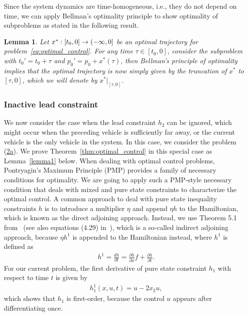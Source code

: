 \documentclass[a4paper]{article}
\theoremstyle{definition}
\theoremstyle{plain}
\newtheorem{lemma}{Lemma}
\begin{document}
Since the system dynamics are time-homogeneous, i.e., they do not depend on
time, we can apply Bellman's optimality principle to show optimality of
subproblems as stated in the following result.

\begin{lemma}
  \label{bellman}
  Let $x^{*}: [t_{0}, 0] \rightarrow (-\infty,0]$ be an optimal
  trajectory for problem~\eqref{eq:optimal_control}. For any time $\tau \in [t_{0}, 0]$, consider the subproblem with
  $t_{0}' = t_{0} + \tau$ and $p_{0}' = p_{0} + x^{*}(\tau)$, then Bellman's
  principle of optimality implies that the optimal trajectory is now simply
  given by the truncation of $x^{*}$ to $[\tau, 0]$, which we will denote by
  $x^{*}|_{[\tau, 0]}$.
\end{lemma}


\subsubsection{Inactive lead constraint}
\label{sec:single_vehicle}

We now consider the case when the lead constraint $h_{2}$ can be ignored,
which might occur when the preceding vehicle is sufficiently far away, or the
current vehicle is the only vehicle in the system. In this case, we consider the
problem (\hyperref[eq:setting]{2a}). We prove Theorem~\ref{thm:optimal_control} in this special case
as Lemma~\ref{lemma1} below.
%
%
When dealing with optimal control problems, Pontryagin's Maximum Principle (PMP)
provides a family of necessary conditions for optimality. We are going to apply
such a PMP-style necessary condition that deals with mixed and pure state
constraints to characterize the optimal control.
%
A common approach to deal with pure state inequality constraints $h$ is to
introduce a multiplier $\eta$ and append $\eta h$ to the Hamiltonian, which is known
as the direct adjoining approach. Instead, we use Theorem 5.1 from~\cite{hartlSurveyMaximumPrinciples1995} (see also
equations (4.29) in~\cite{sethiOptimalControlTheory2019}), which is a so-called indirect adjoining approach,
because $\eta h^{1}$ is appended to the Hamiltonian instead, where $h^{1}$ is
defined as
\begin{align*}
  h^{1} = \frac{dh}{dt} = \frac{\partial h}{\partial x}f + \frac{\partial h}{\partial t} .
\end{align*}
%
For our current problem, the first derivative of pure state constraint $h_{1}$
with respect to time $t$ is given by
\begin{align*}
  h_{1}^{1}(x, u, t) = u - 2x_{2} u ,
\end{align*}
which shows that $h_{1}$ is first-order, because the control $u$ appears after
differentiating once.
\end{document}
